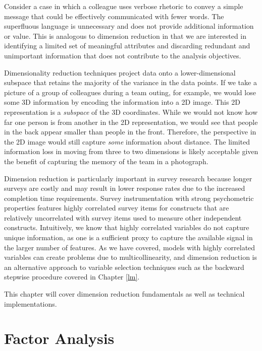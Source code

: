 \documentclass[
]{book}
\begin{document}
Consider a case in which a colleague uses verbose rhetoric to convey a simple message that could be effectively communicated with fewer words. The superfluous language is unnecessary and does not provide additional information or value. This is analogous to dimension reduction in that we are interested in identifying a limited set of meaningful attributes and discarding redundant and unimportant information that does not contribute to the analysis objectives.

Dimensionality reduction techniques project data onto a lower-dimensional subspace that retains the majority of the variance in the data points. If we take a picture of a group of colleagues during a team outing, for example, we would lose some 3D information by encoding the information into a 2D image. This 2D representation is a \emph{subspace} of the 3D coordinates. While we would not know how far one person is from another in the 2D representation, we would see that people in the back appear smaller than people in the front. Therefore, the perspective in the 2D image would still capture \emph{some} information about distance. The limited information loss in moving from three to two dimensions is likely acceptable given the benefit of capturing the memory of the team in a photograph.

Dimension reduction is particularly important in survey research because longer surveys are costly and may result in lower response rates due to the increased completion time requirements. Survey instrumentation with strong psychometric properties features highly correlated survey items for constructs that are relatively uncorrelated with survey items used to measure other independent constructs. Intuitively, we know that highly correlated variables do not capture unique information, as one is a sufficient proxy to capture the available signal in the larger number of features. As we have covered, models with highly correlated variables can create problems due to multicollinearity, and dimension reduction is an alternative approach to variable selection techniques such as the backward stepwise procedure covered in Chapter \ref{lm}.

This chapter will cover dimension reduction fundamentals as well as technical implementations.

\hypertarget{factor-analysis}{%
\section{Factor Analysis}\label{factor-analysis}}
\end{document}
